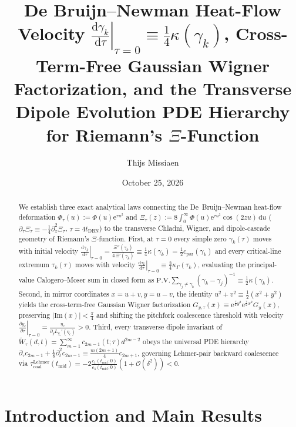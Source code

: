 \documentclass[11pt,reqno]{amsart}
\title[De Bruijn--Newman Velocity, Wigner Factorization, and Dipole PDE Hierarchy]{De Bruijn--Newman Heat-Flow Velocity $\left.\frac{\mathrm{d}\gamma_k}{\mathrm{d}\tau}\right|_{\tau=0} \equiv \frac{1}{4}\kappa(\gamma_k)$, Cross-Term-Free Gaussian Wigner Factorization, and the Transverse Dipole Evolution PDE Hierarchy for Riemann's $\Xi$-Function}
\author{Thijs Missiaen}
\date{October 25, 2026}
\theoremstyle{definition}
\theoremstyle{remark}
\numberwithin{equation}{section}
\newcommand{\dd}{\mathrm{d}}
\newcommand{\ee}{\mathrm{e}}
\newcommand{\Ima}{\mathrm{Im}}
\newcommand{\PV}{\mathrm{P.V.}}
\begin{document}
\sloppy

\begin{abstract}
We establish three exact analytical laws connecting the De~Bruijn--Newman heat-flow deformation $\Phi_\tau(u) := \Phi(u)\ee^{\tau u^2}$ and $\Xi_\tau(z) := 8\int_0^\infty \Phi(u)\ee^{\tau u^2}\cos(2zu)\,\dd u$ ($\partial_\tau\Xi_\tau \equiv -\frac{1}{4}\partial_z^2\Xi_\tau$, $\tau = 4t_{\mathrm{DBN}}$) to the transverse Chladni, Wigner, and dipole-cascade geometry of Riemann's $\Xi$-function. First, at $\tau = 0$ every simple zero $\gamma_k(\tau)$ moves with initial velocity $\left.\frac{\dd\gamma_k}{\dd\tau}\right|_{\tau=0} = \frac{\Xi''(\gamma_k)}{4\,\Xi'(\gamma_k)} \equiv \frac{1}{4}\kappa(\gamma_k) = \frac{1}{2}c_{\mathrm{par}}(\gamma_k)$ and every critical-line extremum $\tau_k(\tau)$ moves with velocity $\left.\frac{\dd\tau_k}{\dd\tau}\right|_{\tau=0} \equiv \frac{3}{4}\kappa_\Gamma(\tau_k)$, evaluating the principal-value Calogero--Moser sum in closed form as $\PV\sum_{\gamma_j\neq\gamma_k}(\gamma_k-\gamma_j)^{-1} \equiv \frac{1}{2}\kappa(\gamma_k)$. Second, in mirror coordinates $x = u+v, y = u-v$, the identity $u^2+v^2 \equiv \frac{1}{2}(x^2+y^2)$ yields the cross-term-free Gaussian Wigner factorization $G_{y,\tau}(x) \equiv \ee^{\frac{\tau}{2}y^2}\ee^{\frac{\tau}{2}x^2}G_y(x)$, preserving $|\Ima(x)| < \frac{\pi}{4}$ and shifting the pitchfork coalescence threshold with velocity $\left.\frac{\partial y_c}{\partial\tau}\right|_{\tau=0} = \frac{\eta_c}{\partial_y L_{y_c}'(\eta_c)} > 0$. Third, every transverse dipole invariant of $\widetilde{W}_\tau(d,t) = \sum_{m=1}^\infty c_{2m-1}(t;\tau)d^{2m-2}$ obeys the universal PDE hierarchy $\partial_\tau c_{2m-1} + \frac{1}{8}\partial_t^2 c_{2m-1} \equiv \frac{m(2m+1)}{4}c_{2m+1}$, governing Lehmer-pair backward coalescence via $\tau_{\mathrm{coal}}^{\mathrm{Lehmer}}(t_{\mathrm{mid}}) = -2\frac{c_1(t_{\mathrm{mid}};0)}{c_3(t_{\mathrm{mid}};0)}(1+\mathcal{O}(\delta^2)) < 0$.
\end{abstract}

\maketitle

\section{Introduction and Main Results}\label{sec:intro}
\end{document}
